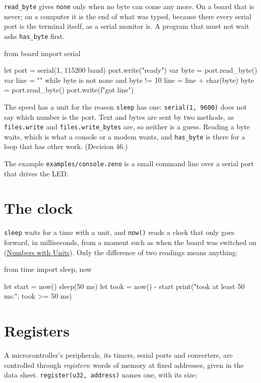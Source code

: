 \verb|read_byte| gives \verb|none| only when no byte can come any
more. On a board that is never; on a computer it is the end of what
was typed, because there every serial port is the terminal itself, as
a serial monitor is. A program that must not wait asks
\verb|has_byte| first.

\begin{zeno}[stdin=on\nstatus\n]
from board import serial

let port = serial(1, 115200 baud)
port.write("ready\n")
var byte = port.read_byte()
var line = ""
while byte is not none and byte != 10 {
    line = line + char(byte)
    byte = port.read_byte()
}
port.write(f"got {line}\n")
\end{zeno}

\begin{why}
The speed has a unit for the reason \verb|sleep| has one:
\verb|serial(1, 9600)| does not say which number is the port.
Text and bytes are sent by two methods, as \verb|files.write| and
\verb|files.write_bytes| are, so neither is a guess. Reading a byte
waits, which is what a console or a modem wants, and
\verb|has_byte| is there for a loop that has other work.
(Decision 46.)
\end{why}

The example \verb|examples/console.zeno| is a small command line over
a serial port that drives the LED.

\section{The clock}

\verb|sleep| waits for a time with a unit, and \verb|now()| reads a
clock that only goes forward, in milliseconds, from a moment such as
when the board was switched on (\hyperref[ch-units]{Numbers with
Units}). Only the difference of two readings means anything:

\begin{zeno}
from time import sleep, now

let start = now()
sleep(50 ms)
let took = now() - start
print("took at least 50 ms:", took >= 50 ms)
\end{zeno}

\section{Registers}

A microcontroller's peripherals, its timers, serial ports and
converters, are controlled through \emph{registers}: words of memory
at fixed addresses, given in the data sheet. \verb|register(u32, address)|
 names one, with its size:

